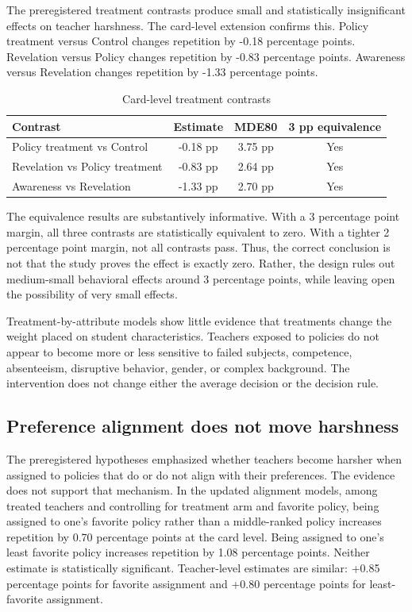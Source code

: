 \documentclass[12pt,a4paper]{article}
\begin{document}
The preregistered treatment contrasts produce small and statistically insignificant effects on teacher harshness. The card-level extension confirms this. Policy treatment versus Control changes repetition by -0.18 percentage points. Revelation versus Policy changes repetition by -0.83 percentage points. Awareness versus Revelation changes repetition by -1.33 percentage points.

\begin{table}[htbp]
\centering
\caption{Card-level treatment contrasts}
\begin{tabular}{lccc}
\toprule
Contrast & Estimate & MDE80 & 3 pp equivalence \\
\midrule
Policy treatment vs Control & -0.18 pp & 3.75 pp & Yes \\
Revelation vs Policy treatment & -0.83 pp & 2.64 pp & Yes \\
Awareness vs Revelation & -1.33 pp & 2.70 pp & Yes \\
\bottomrule
\end{tabular}
\end{table}

The equivalence results are substantively informative. With a 3 percentage point margin, all three contrasts are statistically equivalent to zero. With a tighter 2 percentage point margin, not all contrasts pass. Thus, the correct conclusion is not that the study proves the effect is exactly zero. Rather, the design rules out medium-small behavioral effects around 3 percentage points, while leaving open the possibility of very small effects.

Treatment-by-attribute models show little evidence that treatments change the weight placed on student characteristics. Teachers exposed to policies do not appear to become more or less sensitive to failed subjects, competence, absenteeism, disruptive behavior, gender, or complex background. The intervention does not change either the average decision or the decision rule.

\subsection{Preference alignment does not move harshness}

The preregistered hypotheses emphasized whether teachers become harsher when assigned to policies that do or do not align with their preferences. The evidence does not support that mechanism. In the updated alignment models, among treated teachers and controlling for treatment arm and favorite policy, being assigned to one's favorite policy rather than a middle-ranked policy increases repetition by 0.70 percentage points at the card level. Being assigned to one's least favorite policy increases repetition by 1.08 percentage points. Neither estimate is statistically significant. Teacher-level estimates are similar: +0.85 percentage points for favorite assignment and +0.80 percentage points for least-favorite assignment.
\end{document}
